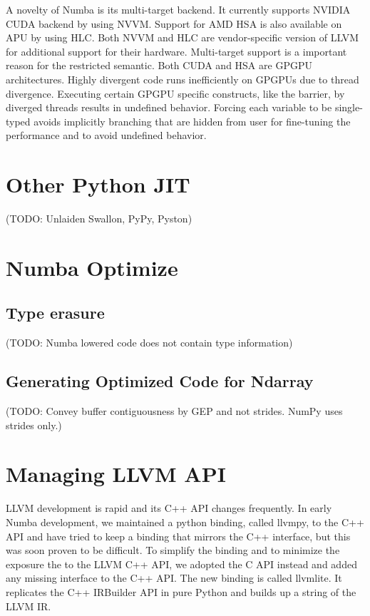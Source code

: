 \documentclass{acm_proc_article-sp}
\begin{document}
A novelty of Numba is its multi-target backend.  It currently supports NVIDIA
CUDA backend by using NVVM.  Support for AMD HSA is also available on APU by
using HLC.  Both NVVM and HLC are vendor-specific version of LLVM for
additional support for their hardware.  Multi-target support is a important
reason for the restricted semantic.  Both CUDA and HSA are GPGPU architectures.
Highly divergent code runs inefficiently on GPGPUs due to thread divergence.
Executing certain GPGPU specific constructs, like the barrier, by diverged
threads results in undefined behavior. Forcing each variable to be single-typed
avoids implicitly branching that are hidden from user for fine-tuning the
performance and to avoid undefined behavior.


\section{Other Python JIT}

(TODO: Unlaiden Swallon, PyPy, Pyston)

\section{Numba Optimize}


\subsection{Type erasure}

(TODO: Numba lowered code does not contain type information)

\subsection{Generating Optimized Code for Ndarray}

(TODO: Convey buffer contiguousness by GEP and not strides.
NumPy uses strides only.)


\section{Managing LLVM API}

LLVM development is rapid and its C++ API changes frequently.
In early Numba development, we maintained a python binding, called llvmpy,
to the C++ API and have tried to keep a binding that mirrors the C++ interface,
but this was soon proven to be difficult.
To simplify the binding and to minimize the exposure the to the LLVM C++ API,
we adopted the C API instead and added any missing interface to the C++ API.
The new binding is called llvmlite.  It replicates the C++ IRBuilder API in
pure Python and builds up a string of the LLVM IR.
\end{document}
